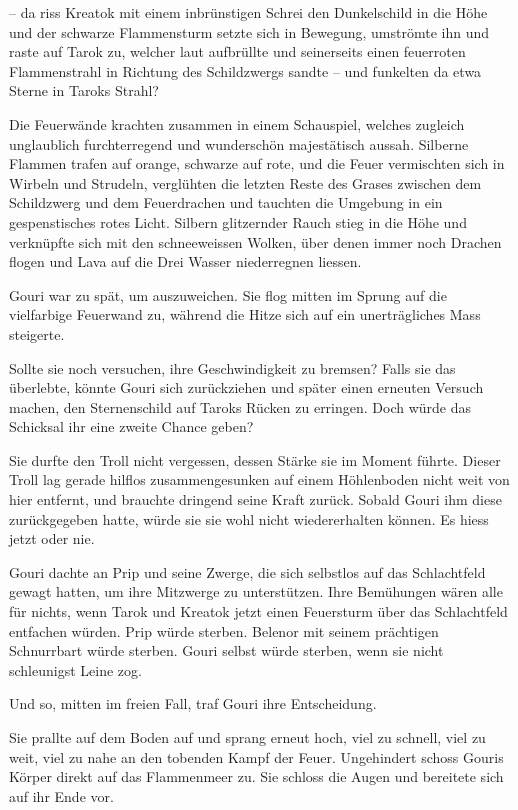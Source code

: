 – da riss Kreatok mit einem inbrünstigen Schrei den Dunkelschild in die Höhe und der schwarze Flammensturm setzte sich in Bewegung, umströmte ihn und raste auf Tarok zu, welcher laut aufbrüllte und seinerseits einen feuerroten Flammenstrahl in Richtung des Schildzwergs sandte – und funkelten da etwa Sterne in Taroks Strahl?

Die Feuerwände krachten zusammen in einem Schauspiel, welches zugleich unglaublich furchterregend und wunderschön majestätisch aussah. Silberne Flammen trafen auf orange, schwarze auf rote, und die Feuer vermischten sich in Wirbeln und Strudeln, verglühten die letzten Reste des Grases zwischen dem Schildzwerg und dem Feuerdrachen und tauchten die Umgebung in ein gespenstisches rotes Licht. Silbern glitzernder Rauch stieg in die Höhe und verknüpfte sich mit den schneeweissen Wolken, über denen immer noch Drachen flogen und Lava auf die Drei Wasser niederregnen liessen.

Gouri war zu spät, um auszuweichen. Sie flog mitten im Sprung auf die vielfarbige Feuerwand zu, während die Hitze sich auf ein unerträgliches Mass steigerte.

Sollte sie noch versuchen, ihre Geschwindigkeit zu bremsen? Falls sie das überlebte, könnte Gouri sich zurückziehen und später einen erneuten Versuch machen, den Sternenschild auf Taroks Rücken zu erringen. Doch würde das Schicksal ihr eine zweite Chance geben?

Sie durfte den Troll nicht vergessen, dessen Stärke sie im Moment führte. Dieser Troll lag gerade hilflos zusammengesunken auf einem Höhlenboden nicht weit von hier entfernt, und brauchte dringend seine Kraft zurück. Sobald Gouri ihm diese zurückgegeben hatte, würde sie sie wohl nicht wiedererhalten können. Es hiess jetzt oder nie.

Gouri dachte an Prip und seine Zwerge, die sich selbstlos auf das Schlachtfeld gewagt hatten, um ihre Mitzwerge zu unterstützen. Ihre Bemühungen wären alle für nichts, wenn Tarok und Kreatok jetzt einen Feuersturm über das Schlachtfeld entfachen würden. Prip würde sterben. Belenor mit seinem prächtigen Schnurrbart würde sterben. Gouri selbst würde sterben, wenn sie nicht schleunigst Leine zog.

Und so, mitten im freien Fall, traf Gouri ihre Entscheidung.

Sie prallte auf dem Boden auf und sprang erneut hoch, viel zu schnell, viel zu weit, viel zu nahe an den tobenden Kampf der Feuer. Ungehindert schoss Gouris Körper direkt auf das Flammenmeer zu. Sie schloss die Augen und bereitete sich auf ihr Ende vor.

